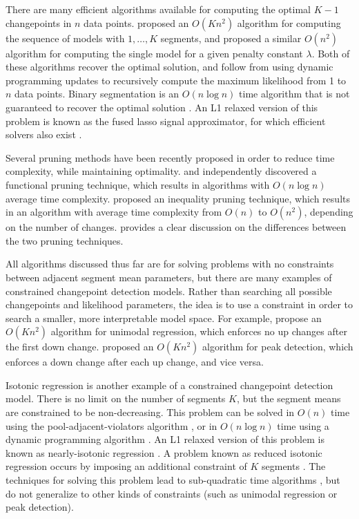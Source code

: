 \documentclass{article}
\begin{document}
There are many efficient algorithms available for computing the
optimal $K-1$ changepoints in $n$ data
points. \citet{segment-neighborhood} proposed an $O(K n^2)$ algorithm
for computing the sequence of models with $1,\dots,K$ segments, and
\citet{optimal-partitioning} proposed a similar $O(n^2)$ algorithm for
computing the single model for a given penalty constant
$\lambda$. Both of these algorithms recover the optimal solution, and
follow from using dynamic programming updates \citep{bellman} to
recursively compute the maximum likelihood from 1 to $n$ data
points. Binary segmentation is an $O(n\log n)$ time algorithm that is
not guaranteed to recover the optimal solution
\citep{binary-segmentation}. An L1 relaxed version of this problem is
known as the fused lasso signal approximator, for which efficient
solvers also exist \citep{flsa}.

Several pruning methods have been recently proposed in order to reduce
time complexity, while maintaining optimality.  \citet{pruned-dp} and
\citet{phd-johnson} independently discovered a functional pruning
technique, which results in algorithms with $O(n\log n)$ average time
complexity. \citet{pelt} proposed an inequality pruning technique,
which results in an algorithm with average time complexity from $O(n)$
to $O(n^2)$, depending on the number of changes. \citet{fpop} provides
a clear discussion on the differences between the two pruning
techniques.

All algorithms discussed thus far are for solving problems with no
constraints between adjacent segment mean parameters, but there are
many examples of constrained changepoint detection models. Rather
than searching all possible changepoints and likelihood parameters,
the idea is to use a constraint in order to search a smaller, more
interpretable model space. For example, \citet{haiminen2008algorithms}
propose an $O(Kn^2)$ algorithm for unimodal regression, which enforces
no up changes after the first down change. \citet{HOCKING-PeakSeg}
proposed an $O(Kn^2)$ algorithm for peak detection, which enforces a
down change after each up change, and vice versa.

Isotonic regression is another example of a constrained changepoint
detection model. There is no limit on the number of segments $K$, but
the segment means are constrained to be non-decreasing. This problem
can be solved in $O(n)$ time using the pool-adjacent-violators
algorithm \citep{mair2009isotone}, or in $O(n\log n)$ time using a
dynamic programming algorithm \citep{isotonic-dp}. An L1 relaxed
version of this problem is known as nearly-isotonic regression
\citep{tibshirani2011nearly}. A problem known as reduced isotonic
regression occurs by imposing an additional constraint of $K$ segments
\citep{reduced-monotonic-regression}. The techniques for solving this
problem lead to sub-quadratic time algorithms
\citep{hardwick2014optimal}, but do not generalize to other kinds of
constraints (such as unimodal regression or peak detection).
\end{document}
